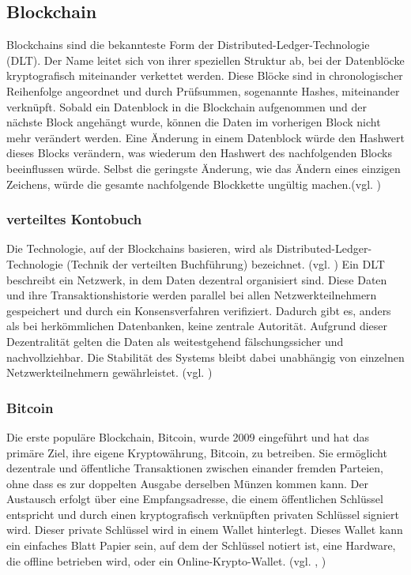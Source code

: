 \subsection{Blockchain}
Blockchains sind die bekannteste Form der Distributed-Ledger-Technologie (DLT). Der Name leitet sich von ihrer speziellen Struktur ab, bei der Datenblöcke kryptografisch miteinander verkettet werden. Diese Blöcke sind in chronologischer Reihenfolge angeordnet und durch Prüfsummen, sogenannte Hashes, miteinander verknüpft. Sobald ein Datenblock in die Blockchain aufgenommen und der nächste Block angehängt wurde, können die Daten im vorherigen Block nicht mehr verändert werden. Eine Änderung in einem Datenblock würde den Hashwert dieses Blocks verändern, was wiederum den Hashwert des nachfolgenden Blocks beeinflussen würde. Selbst die geringste Änderung, wie das Ändern eines einzigen Zeichens, würde die gesamte nachfolgende Blockkette ungültig machen.(vgl. \cite{Blockchain})

\subsubsection{verteiltes Kontobuch}
Die Technologie, auf der Blockchains basieren, wird als Distributed-Ledger-Technologie (\glqq Technik der verteilten Buchführung\grqq{}) bezeichnet. (vgl. \cite{DripDLT}) Ein DLT beschreibt ein Netzwerk, in dem Daten dezentral organisiert sind. Diese Daten und ihre Transaktionshistorie werden parallel bei allen Netzwerkteilnehmern gespeichert und durch ein Konsensverfahren verifiziert. Dadurch gibt es, anders als bei herkömmlichen Datenbanken, keine zentrale Autorität. Aufgrund dieser Dezentralität gelten die Daten als weitestgehend fälschungssicher und nachvollziehbar. Die Stabilität des Systems bleibt dabei unabhängig von einzelnen Netzwerkteilnehmern gewährleistet. (vgl. \cite{Blockchain})

\subsubsection{Bitcoin}
Die erste populäre Blockchain, Bitcoin, wurde 2009 eingeführt und hat das primäre Ziel, ihre eigene Kryptowährung, Bitcoin, zu betreiben. Sie ermöglicht dezentrale und öffentliche Transaktionen zwischen einander fremden Parteien, ohne dass es zur doppelten Ausgabe derselben Münzen kommen kann. Der Austausch erfolgt über eine Empfangsadresse, die einem öffentlichen Schlüssel entspricht und durch einen kryptografisch verknüpften privaten Schlüssel signiert wird. Dieser private Schlüssel wird in einem Wallet hinterlegt. Dieses Wallet kann ein einfaches Blatt Papier sein, auf dem der Schlüssel notiert ist, eine Hardware, die offline betrieben wird, oder ein Online-Krypto-Wallet. (vgl. \cite{Blockchain}, \cite{BTC})


